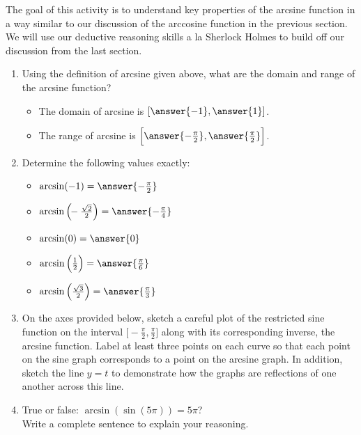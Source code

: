 \documentclass{ximera}
\begin{document}
\begin{problem}
The goal of this activity is to understand key properties of the arcsine function in a way similar to our discussion of the arccosine function in the previous section. We will use our deductive reasoning skills a la Sherlock Holmes to build off our discussion from the last section.%
\begin{enumerate}
\item
Using the definition of arcsine given above, what are the domain and range of the arcsine function? \\
\begin{itemize}
\item The domain of arcsine is $[\answer{-1} , \answer{1}]$.
%
\item The range of arcsine is $\Big[\answer{-\frac{\pi}{2}},\answer{\frac{\pi}{2}}\Big]$.
\end{itemize}
%
\item Determine the following values exactly: 
\begin{itemize}
\item $\arcsin(-1) = \answer{-\frac{\pi}{2}}$ 
%
\item $\arcsin\Big(\!\!-\frac{\sqrt{2}}{2}\Big) = \answer{-\frac{\pi}{4}}$
%
\item $\arcsin(0) = \answer{0}$
%
\item $\arcsin\Big(\frac{1}{2}\Big) = \answer{\frac{\pi}{6}}$
%
\item $\arcsin\Big(\frac{\sqrt{3}}{2}\Big) = \answer{\frac{\pi}{3}}$
\end{itemize}
%
\item
On the axes provided below, sketch a careful plot of the restricted sine function on the interval $\Big[\!\!-\!\frac{\pi}{2},\frac{\pi}{2}\Big]$ along with its corresponding inverse, the arcsine function.  Label at least three points on each curve so that each point on the sine graph corresponds to a point on the arcsine graph.  In addition, sketch the line $y = t$ to demonstrate how the graphs are reflections of one another across this line.
%
%
\item True or false: $\arcsin(\sin(5\pi)) = 5\pi$?  \\
Write a complete sentence to explain your reasoning.%
\end{enumerate}
\begin{image}

\end{image}
\end{problem}
\end{document}
